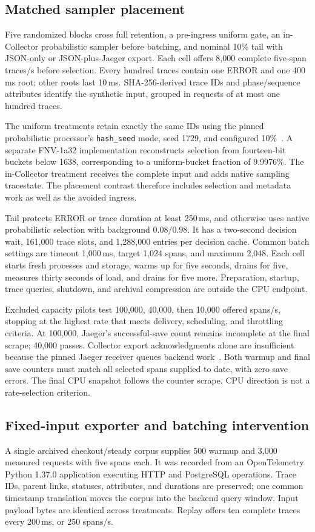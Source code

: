 \subsection{Matched sampler placement}\label{sec:boundary-method}
Five randomized blocks cross full retention, a pre-ingress uniform gate, an in-Collector probabilistic sampler before batching, and nominal 10\% tail with JSON-only or JSON-plus-Jaeger export. Each cell offers 8,000 complete five-span traces/s before selection. Every hundred traces contain one ERROR and one 400\,ms root; other roots last 10\,ms. SHA-256-derived trace IDs and phase/sequence attributes identify the synthetic input, grouped in requests of at most one hundred traces.

The uniform treatments retain exactly the same IDs using the pinned probabilistic processor's \texttt{hash\_seed} mode, seed 1729, and configured 10\%~\cite{otelProbabilistic0136}. A separate FNV-1a32 implementation reconstructs selection from fourteen-bit buckets below 1638, corresponding to a uniform-bucket fraction of 9.9976\%. The in-Collector treatment receives the complete input and adds native sampling tracestate. The placement contrast therefore includes selection and metadata work as well as the avoided ingress.

Tail protects ERROR or trace duration at least 250\,ms, and otherwise uses native probabilistic selection with background $0.08/0.98$. It has a two-second decision wait, 161,000 trace slots, and 1,288,000 entries per decision cache. Common batch settings are timeout 1,000\,ms, target 1,024 spans, and maximum 2,048. Each cell starts fresh processes and storage, warms up for five seconds, drains for five, measures thirty seconds of load, and drains for five more. Preparation, startup, trace queries, shutdown, and archival compression are outside the CPU endpoint.

Excluded capacity pilots test 100,000, 40,000, then 10,000 offered spans/s, stopping at the highest rate that meets delivery, scheduling, and throttling criteria. At 100,000, Jaeger's successful-save count remains incomplete at the final scrape; 40,000 passes. Collector export acknowledgments alone are insufficient because the pinned Jaeger receiver queues backend work~\cite{jaegerSpanProcessor176}. Both warmup and final save counters must match all selected spans supplied to date, with zero save errors. The final CPU snapshot follows the counter scrape. CPU direction is not a rate-selection criterion.

\subsection{Fixed-input exporter and batching intervention}\label{sec:export-method}
A single archived checkout/steady corpus supplies 500 warmup and 3,000 measured requests with five spans each. It was recorded from an OpenTelemetry Python 1.37.0 application executing HTTP and PostgreSQL operations. Trace IDs, parent links, statuses, attributes, and durations are preserved; one common timestamp translation moves the corpus into the backend query window. Input payload bytes are identical across treatments. Replay offers ten complete traces every 200\,ms, or 250 spans/s.


